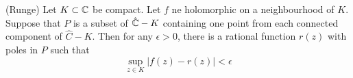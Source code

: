 \begin{theorem}
    (Runge) Let $K\subset\mathbb{C}$ be compact. Let $f$ ne holomorphic on a neighbourhood of $K$. Suppose that $P$ is a subset of $\hat{\mathbb{C}}-K$ containing one point from each connected component of $\hat{C}-K$. Then for any $\epsilon >0$, there is a rational function $r(z)$ with poles in $P$ such that
    \[
    \sup_{z\in K}|f(z)-r(z)| < \epsilon
    \]
\end{theorem}

